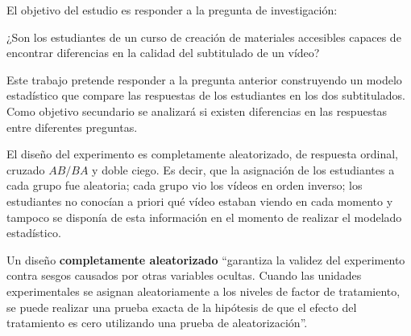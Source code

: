 \documentclass[
  12pt,
  a4paper,
  extrafontsizes,
  onecolumn,
  openright]{memoir}
\begin{document}
El objetivo del estudio es responder a la pregunta de investigación:

\begin{tcolorbox}[enhanced jigsaw, colframe=quarto-callout-note-color-frame, opacitybacktitle=0.6, colback=white, opacityback=0, colbacktitle=quarto-callout-note-color!10!white, arc=.35mm, rightrule=.15mm, left=2mm, title=\textcolor{quarto-callout-note-color}{\faInfo}\hspace{0.5em}{Pregunta de investigación}, bottomtitle=1mm, bottomrule=.15mm, breakable, titlerule=0mm, toptitle=1mm, toprule=.15mm, leftrule=.75mm, coltitle=black]

¿Son los estudiantes de un curso de creación de materiales accesibles
capaces de encontrar diferencias en la calidad del subtitulado de un
vídeo?

\end{tcolorbox}

Este trabajo pretende responder a la pregunta anterior construyendo un
modelo estadístico que compare las respuestas de los estudiantes en los
dos subtitulados. Como objetivo secundario se analizará si existen
diferencias en las respuestas entre diferentes preguntas.

El diseño del experimento es completamente aleatorizado, de respuesta
ordinal, cruzado \(AB/BA\) y doble ciego. Es decir, que la asignación de
los estudiantes a cada grupo fue aleatoria; cada grupo vio los vídeos en
orden inverso; los estudiantes no conocían a priori qué vídeo estaban
viendo en cada momento y tampoco se disponía de esta información en el
momento de realizar el modelado estadístico.

Un diseño \textbf{completamente aleatorizado}
\autocite[pp.~18]{lawson2015} \enquote{garantiza la validez del
experimento contra sesgos causados por otras variables ocultas. Cuando
las unidades experimentales se asignan aleatoriamente a los niveles de
factor de tratamiento, se puede realizar una prueba exacta de la
hipótesis de que el efecto del tratamiento es cero utilizando una prueba
de aleatorización}.
\end{document}
